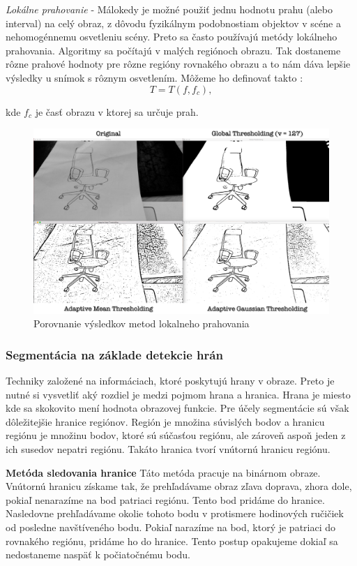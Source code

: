 \textit{Lokálne prahovanie} - Málokedy je možné použiť jednu hodnotu prahu (alebo interval) na celý obraz, z dôvodu fyzikálnym podobnostiam objektov v scéne a  nehomogénnemu osvetleniu scény. Preto sa často používajú metódy lokálneho prahovania. Algoritmy sa počítajú v malých regiónoch obrazu. Tak dostaneme rôzne prahové hodnoty pre rôzne regióny rovnakého obrazu a to nám dáva lepšie výsledky u snímok s rôznym osvetlením. Môžeme ho definovať takto : 
$$T=T(f {,} f_c){,}$$

kde $f_c$ je časť obrazu v ktorej sa určuje prah. 

\begin{figure}[H]
\begin{center}
	\includegraphics[scale=0.15]{obrazky/lokalne_prahovanie}
	\caption{Porovnanie výsledkov metod lokalneho prahovania}
	\end{center}
\end{figure}



\subsubsection{Segmentácia na základe detekcie hrán}
Techniky založené na informáciach, ktoré poskytujú hrany v obraze. Preto je  nutné si vysvetliť aký rozdiel je medzi pojmom hrana a hranica. Hrana je miesto kde sa skokovito mení hodnota obrazovej funkcie. Pre účely segmentácie sú však dôležitejšie hranice regiónov.  Región je množina súvislých bodov a hranicu regiónu je množinu bodov, ktoré sú súčasťou regiónu, ale zároveň aspoň jeden z ich susedov nepatri regiónu. Takáto hranica tvorí vnútornú hranicu regiónu. 

\textbf{Metóda sledovania hranice}
Táto metóda pracuje na binárnom obraze. Vnútornú hranicu získame tak, že  prehľadávame obraz zľava doprava, zhora dole, pokiaľ nenarazíme na bod patriaci regiónu. Tento bod pridáme do hranice. Nasledovne prehľadávame okolie tohoto bodu v protismere hodinových ručičiek od posledne navštíveného bodu. Pokiaľ narazíme na bod, ktorý je patriaci do rovnakého regiónu, pridáme ho do hranice. Tento postup opakujeme dokiaľ sa nedostaneme naspäť k počiatočnému bodu. 


